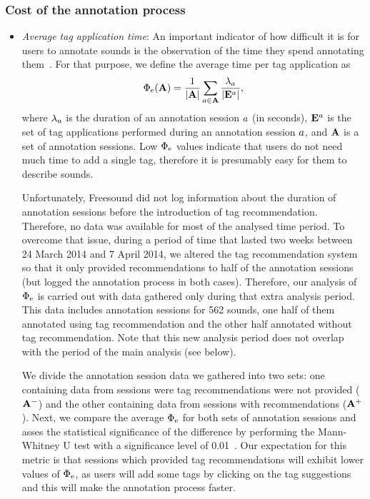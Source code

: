 \subsubsection{Cost of the annotation process}
\label{impact:sec:methods_cost_of_annotation}

\begin{itemize}

	\item \textit{Average tag application time}: An important indicator of how difficult it is for users to annotate sounds is the observation of the time they spend annotating them~\citep{Wang2012}. For that purpose, we define the average time per tag application as
\begin{equation} \Phi_{\text{e}}(\mathbf{A}) =  \frac{1}{|\mathbf{A}|}\sum\limits_{a \in \mathbf{A}}{\frac{\lambda_a}{|\mathbf{E}^a|}}, \label{impact:eq:averae_tag_application_time} \end{equation}
where $\lambda_a$ is the duration of an annotation session $a$ (in seconds), $\mathbf{E}^a$ is the set of tag applications performed during an annotation session $a$, and $\mathbf{A}$ is a set of annotation sessions. Low $\Phi_{\text{e}}$ values indicate that users do not need much time to add a single tag, therefore it is presumably easy for them to describe sounds.

Unfortunately, Freesound did not log information about the duration of annotation sessions before the introduction of tag recommendation. Therefore, no data was available for most of the analysed time period. To overcome that issue, during a period of time that lasted two weeks between 24 March 2014 and 7 April 2014, we altered the tag recommendation system so that it only provided recommendations to half of the annotation sessions (but logged the annotation process in both cases). Therefore, our analysis of $\Phi_{\text{e}}$ is carried out with data gathered only during that extra analysis period. This data includes annotation sessions for 562 sounds, one half of them annotated using tag recommendation and the other half annotated without tag recommendation. Note that this new analysis period does not overlap with the period of the main analysis (see below).

We divide the annotation session data we gathered into two sets: one containing data from sessions were tag recommendations were not provided ($\mathbf{A}^-$) and the other containing data from sessions with recommendations ($\mathbf{A}^+$). Next, we compare the average $\Phi_{\text{e}}$ for both sets of annotation sessions and asses the statistical significance of the difference by performing the Mann-Whitney U test with a significance level of 0.01~\citep{Corder2009}. Our expectation for this metric is that sessions which provided tag recommendations will exhibit lower values of $\Phi_{\text{e}}$, as users will add some tags by clicking on the tag suggestions and this will make the annotation process faster.


\end{itemize}
